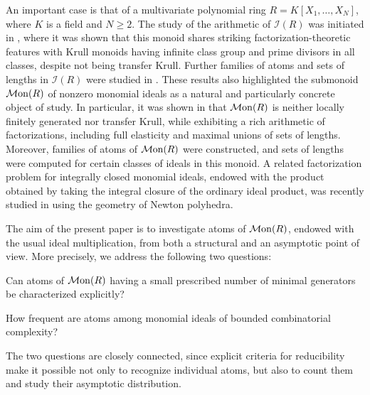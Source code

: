 \documentclass[a4paper,10pt,reqno]{amsart}
\theoremstyle{definition}
\theoremstyle{definition}
\providecommand\Mon{{\mathcal{M}{\rm on}}}
\begin{document}
An important case is that of a multivariate polynomial ring $R=K[X_1,\ldots,X_N]$, where $K$ is a field and $N\geq 2$. The study of the arithmetic of $\mathcal I(R)$ was initiated in \cite{Ge-Kh22}, where it was shown that this monoid shares striking factorization-theoretic features with Krull monoids having infinite class group and prime divisors in all classes, despite not being transfer Krull. Further families of atoms and sets of lengths in $\mathcal I(R)$ were studied in \cite{BCK}. These results also highlighted the submonoid $\Mon(R)$ of nonzero monomial ideals as a natural and particularly concrete object of study. In particular, it was shown in \cite[Section 4]{BCK} that $\Mon(R)$ is neither locally finitely generated nor transfer Krull, while exhibiting a rich arithmetic of factorizations, including full elasticity and maximal unions of sets of lengths. Moreover, families of atoms of $\Mon(R)$ were constructed, and sets of lengths were computed for certain classes of ideals in this monoid. A related factorization problem for integrally closed monomial ideals, endowed with the product obtained by taking the integral closure of the ordinary ideal product, was recently studied in \cite{Lew25} using the geometry of Newton polyhedra.

The aim of the present paper is to investigate atoms of $\Mon(R)$, endowed with the usual ideal multiplication, from both a structural and an asymptotic point of view. More precisely, we address the following two questions:

\vspace{.1cm}
\begin{enumerate*}[label=\textup{(\arabic{*})}]
    \item Can atoms of $\Mon(R)$ having a small prescribed number of minimal generators be characterized explicitly?
\end{enumerate*}

\vspace{.1cm}
\begin{enumerate*}[label=\textup{(\arabic{*})}, resume]
    \item How frequent are atoms among monomial ideals of bounded combinatorial complexity?
\end{enumerate*}

\vspace{.1cm}
The two questions are closely connected, since explicit criteria for reducibility make it possible not only to recognize individual atoms, but also to count them and study their asymptotic distribution.
\end{document}
